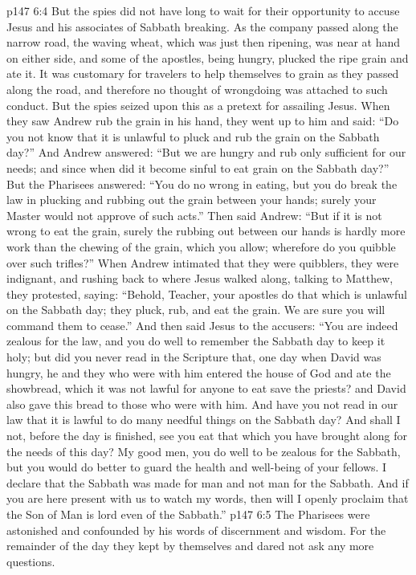\vs p147 6:4 But the spies did not have long to wait for their opportunity to accuse Jesus and his associates of Sabbath breaking. As the company passed along the narrow road, the waving wheat, which was just then ripening, was near at hand on either side, and some of the apostles, being hungry, plucked the ripe grain and ate it. It was customary for travelers to help themselves to grain as they passed along the road, and therefore no thought of wrongdoing was attached to such conduct. But the spies seized upon this as a pretext for assailing Jesus. When they saw Andrew rub the grain in his hand, they went up to him and said: “Do you not know that it is unlawful to pluck and rub the grain on the Sabbath day?” And Andrew answered: “But we are hungry and rub only sufficient for our needs; and since when did it become sinful to eat grain on the Sabbath day?” But the Pharisees answered: “You do no wrong in eating, but you do break the law in plucking and rubbing out the grain between your hands; surely your Master would not approve of such acts.” Then said Andrew: “But if it is not wrong to eat the grain, surely the rubbing out between our hands is hardly more work than the chewing of the grain, which you allow; wherefore do you quibble over such trifles?” When Andrew intimated that they were quibblers, they were indignant, and rushing back to where Jesus walked along, talking to Matthew, they protested, saying: “Behold, Teacher, your apostles do that which is unlawful on the Sabbath day; they pluck, rub, and eat the grain. We are sure you will command them to cease.” And then said Jesus to the accusers: \textcolor{ubdarkred}{“You are indeed zealous for the law, and you do well to remember the Sabbath day to keep it holy; but did you never read in the Scripture that, one day when David was hungry, he and they who were with him entered the house of God and ate the showbread, which it was not lawful for anyone to eat save the priests? and David also gave this bread to those who were with him. And have you not read in our law that it is lawful to do many needful things on the Sabbath day? And shall I not, before the day is finished, see you eat that which you have brought along for the needs of this day? My good men, you do well to be zealous for the Sabbath, but you would do better to guard the health and well\hyp{}being of your fellows. I declare that the Sabbath was made for man and not man for the Sabbath. And if you are here present with us to watch my words, then will I openly proclaim that the Son of Man is lord even of the Sabbath.”}
\vs p147 6:5 The Pharisees were astonished and confounded by his words of discernment and wisdom. For the remainder of the day they kept by themselves and dared not ask any more questions.
